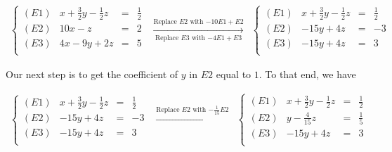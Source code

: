 \documentclass{ximera}
\begin{document}
\begin{example}
\begin{enumerate}
\[ \begin{array}{ccc}

\left\{ 

\begin{array}{lrcr}

(E1) & x+\frac{3}{2}y-\frac{1}{2}z & = & \frac{1}{2} \\ 
(E2) & 10x-z & = & 2 \\
(E3) &  4x-9y+2z & = & 5 \\

\end{array} 

\right.
&
\xrightarrow[\text{Replace $E3$ with $-4E1 + E3$}]{\text{Replace $E2$ with $-10E1 + E2$}}

&

\left\{ 

\begin{array}{lrcr}

(E1) & x+\frac{3}{2}y-\frac{1}{2}z & = & \frac{1}{2} \\ 
(E2) & -15y+4z & = & -3 \\
(E3) & -15y+4z & = & 3 \\

\end{array} 

\right.
 \end{array} \]

Our next step is to get the coefficient of $y$ in $E2$ equal to $1$.  To that end, we have

\[\begin{array}{ccc}
\left\{ 

\begin{array}{lrcr}

(E1) & x+\frac{3}{2}y-\frac{1}{2}z & = & \frac{1}{2} \\  
(E2) & -15y+4z & = & -3 \\  
(E3) & -15y+4z & = & 3 \\

\end{array} 

\right.

&
\xrightarrow{\text{Replace $E2$ with $-\frac{1}{15}E2$}}

&

\left\{ 

\begin{array}{lrcr}

(E1) & x+\frac{3}{2}y-\frac{1}{2}z & = & \frac{1}{2} \\  
(E2) & y - \frac{4}{15}z & = & \frac{1}{5} \\  
(E3) & -15y+4z & = & 3 \\


\end{array}
\end{array}\]
\end{enumerate}
\end{example}
\end{document}
